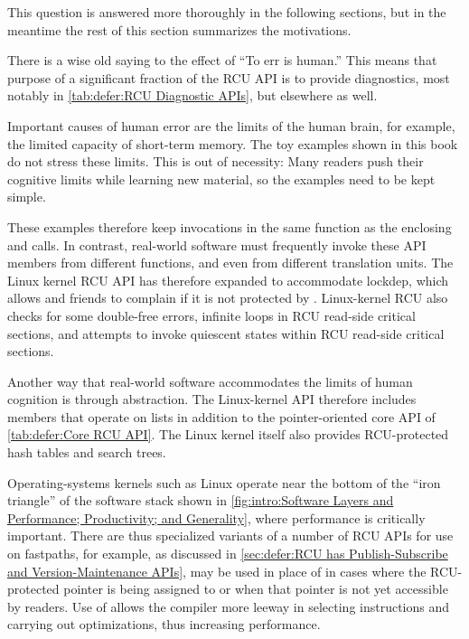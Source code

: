 This question is answered more thoroughly in the following sections,
but in the meantime the rest of this section summarizes the motivations.

There is a wise old saying to the effect of ``To err is human.''
This means that purpose of a significant fraction of the RCU API is to
provide diagnostics, most notably in \cref{tab:defer:RCU Diagnostic APIs},
but elsewhere as well.

Important causes of human error are the limits of the human brain,
for example, the limited capacity of short-term memory.
The toy examples shown in this book do not stress these limits.
This is out of necessity:
Many readers push their cognitive limits while learning new material,
so the examples need to be kept simple.

These examples therefore keep  invocations
in the same function as the enclosing  and
 calls.
In contrast, real-world software must frequently invoke these API members
from different functions, and even from different translation units.
The Linux kernel RCU API has therefore expanded to accommodate lockdep,
which allows  and friends to complain if it is
not protected by .
Linux-kernel RCU also checks for some double-free errors, infinite
loops in RCU read-side critical sections, and attempts to invoke
quiescent states within RCU read-side critical sections.

Another way that real-world software accommodates the limits of human
cognition is through abstraction.
The Linux-kernel API therefore includes members that operate on lists
in addition to the pointer-oriented core API of
\cref{tab:defer:Core RCU API}.
The Linux kernel itself also provides RCU-protected hash tables and
search trees.

Operating-systems kernels such as Linux operate near the bottom of the
``iron triangle'' of the software stack shown in
\cref{fig:intro:Software Layers and Performance; Productivity; and Generality},
where performance is critically important.
There are thus specialized variants of a number of RCU APIs for use on
fastpaths, for example, as discussed in
\cref{sec:defer:RCU has Publish-Subscribe and Version-Maintenance APIs},
 may be used in
place of  in cases where the RCU-protected pointer
is being assigned to  or when that pointer is not yet accessible
by readers.
Use of  allows the compiler more leeway in
selecting instructions and carrying out optimizations, thus increasing
performance.

